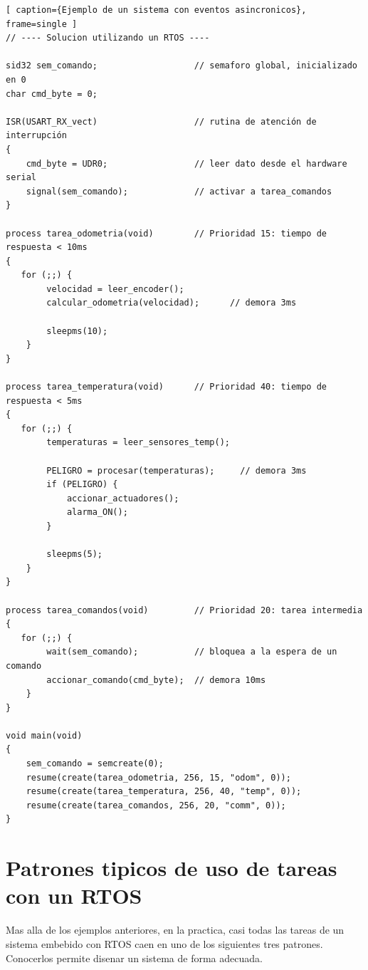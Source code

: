 \documentclass[output=paper, 
colorlinks,
citecolor=brown,
newtxmath
]{langscibook}
\begin{document}
\begin{codefloat}[tp]
\begin{lstlisting}[ caption={Ejemplo de un sistema con eventos asincronicos}, frame=single ]
// ---- Solucion utilizando un RTOS ----

sid32 sem_comando;                   // semaforo global, inicializado en 0
char cmd_byte = 0;

ISR(USART_RX_vect)                   // rutina de atención de interrupción
{
    cmd_byte = UDR0;                 // leer dato desde el hardware serial
    signal(sem_comando);             // activar a tarea_comandos 
}

process tarea_odometria(void)        // Prioridad 15: tiempo de respuesta < 10ms
{
   for (;;) {
        velocidad = leer_encoder();
        calcular_odometria(velocidad);      // demora 3ms
	
        sleepms(10);   
    }         
}

process tarea_temperatura(void)      // Prioridad 40: tiempo de respuesta < 5ms
{
   for (;;) {
        temperaturas = leer_sensores_temp();

        PELIGRO = procesar(temperaturas);     // demora 3ms
        if (PELIGRO) {
            accionar_actuadores();
            alarma_ON();	
        }

        sleepms(5);
    }
}

process tarea_comandos(void)         // Prioridad 20: tarea intermedia 
{
   for (;;) {
        wait(sem_comando);           // bloquea a la espera de un comando
        accionar_comando(cmd_byte);  // demora 10ms
    }         
}

void main(void) 
{
    sem_comando = semcreate(0);
    resume(create(tarea_odometria, 256, 15, "odom", 0));
    resume(create(tarea_temperatura, 256, 40, "temp", 0));
    resume(create(tarea_comandos, 256, 20, "comm", 0));
}
\end{lstlisting}
\end{codefloat}

\newpage
\section{Patrones tipicos de uso de tareas con un RTOS}
Mas alla de los ejemplos anteriores, en la practica, casi todas las tareas de un sistema embebido con RTOS caen en uno de los siguientes tres patrones. Conocerlos permite disenar un sistema de forma adecuada.
\end{document}
